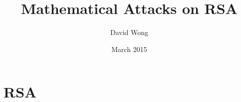 \documentclass[a4paper,11pt]{article}
\title{Mathematical Attacks on RSA}
\author{David Wong}
\date{March 2015}
\begin{document}
\maketitle

\section{RSA}\label{rsa}
\end{document}
